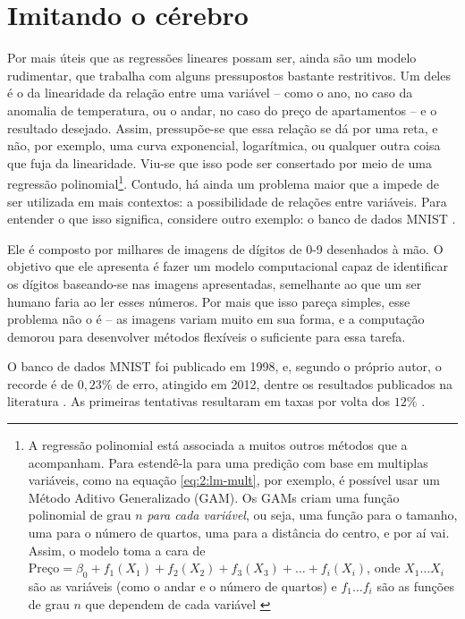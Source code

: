 \section{Imitando o cérebro}\label{sec:2:redes-neurais}
Por mais úteis que as regressões lineares possam ser, ainda são um modelo rudimentar, que trabalha com alguns pressupostos bastante restritivos.
Um deles é o da linearidade da relação entre uma variável -- como o ano, no caso da anomalia de temperatura, ou o andar, no caso do preço de apartamentos -- e o resultado desejado.
Assim, pressupõe-se que essa relação se dá por uma reta, e não, por exemplo, uma curva exponencial, logarítmica, ou qualquer outra coisa que fuja da linearidade.
Viu-se que isso pode ser consertado por meio de uma regressão polinomial\footnote{A regressão polinomial está associada a muitos outros métodos que a acompanham. Para estendê-la para uma predição com base em multiplas variáveis, como na equação \ref{eq:2:lm-mult}, por exemplo, é possível usar um Método Aditivo Generalizado (GAM). Os GAMs criam uma função polinomial de grau $n$ \textit{para cada variável}, ou seja, uma função para o tamanho, uma para o número de quartos, uma para a distância do centro, e por aí vai. Assim, o modelo toma a cara de $\text{Preço} = \beta_0 + f_1(X_1) + f_2(X_2) + f_3(X_3) + \dots + f_i(X_i)$, onde $X_1\dots X_i$ são as variáveis (como o andar e o número de quartos) e $f_1\dots f_i$ são as funções de grau $n$ que dependem de cada variável \cite{james_introduction_2021a}}.
Contudo, há ainda um problema maior que a impede de ser utilizada em mais contextos: a possibilidade de relações entre variáveis.
Para entender o que isso significa, considere outro exemplo: o banco de dados MNIST \cite{lecun_mnist_1998}.

Ele é composto por milhares de imagens de dígitos de 0-9 desenhados à mão.
O objetivo que ele apresenta é fazer um modelo computacional capaz de identificar os dígitos baseando-se nas imagens apresentadas, semelhante ao que um ser humano faria ao ler esses números.
Por mais que isso pareça simples, esse problema não o é -- as imagens variam muito em sua forma, e a computação demorou para desenvolver métodos flexíveis o suficiente para essa tarefa.

O banco de dados MNIST foi publicado em 1998, e, segundo o próprio autor, o recorde é de $0,23\%$ de erro, atingido em 2012, dentre os resultados publicados na literatura \cite{cireşan_multicolumn_2012}.
As primeiras tentativas resultaram em taxas por volta dos $12\%$ \cite{lecun_mnist_1998}.

